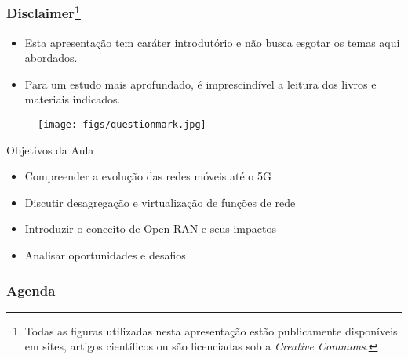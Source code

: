 
\begin{frame}
    \frametitle{Disclaimer\footnote{Todas as figuras utilizadas nesta apresentação estão publicamente disponíveis em sites, artigos científicos ou são licenciadas sob a \textit{Creative Commons}.}}
    \begin{itemize}
        \item Esta apresentação tem caráter introdutório e não busca esgotar os temas aqui abordados.
        \item Para um estudo mais aprofundado, é imprescindível a leitura dos livros e materiais indicados.
    \end{itemize}
    \begin{figure}
        \centering
        \texttt{[image: figs/questionmark.jpg]}
    \end{figure}
    \vspace{0.8cm}
\end{frame}

\begin{frame}{Objetivos da Aula}
\begin{itemize}
  \item Compreender a evolução das redes móveis até o 5G
  \item Discutir desagregação e virtualização de funções de rede
  \item Introduzir o conceito de Open RAN e seus impactos
  \item Analisar oportunidades e desafios
\end{itemize}
\end{frame}

\begin{frame}
    \frametitle{Agenda}
    \tableofcontents
\end{frame}